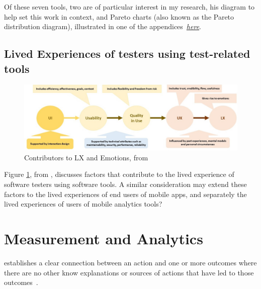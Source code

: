 Of these seven tools, two are of particular interest in my research, his diagram to help set this work in context, and Pareto charts (also known as the Pareto distribution diagram), illustrated in one of the appendices~\hyperlink{pareto.diagrams.in.r}{\emph{here}}.


\subsection{Lived Experiences of testers using test-related tools}
\begin{figure}
    \centering
    \includegraphics[width=15cm]{images/isabel-evans/Contributors_to_LX_v3.jpeg}
    \caption{Contributors to LX and Emotions, from~\citealp{evans2021_scared_frustrated_and_quietly_proud}}
    \label{fig:contributors-to-lx-and-emotions-v3}
\end{figure}

Figure \ref{fig:contributors-to-lx-and-emotions-v3}, from \citealp{evans2021_scared_frustrated_and_quietly_proud}, discusses factors that contribute to the lived experience of software testers using software tools. A similar consideration may extend these factors to the lived experiences of end users of mobile apps, and separately the lived experiences of users of mobile analytics tools?





\section{Measurement and Analytics}
 establishes a clear connection between an action and one or more outcomes where there are no other know explanations or sources of actions that have led to those outcomes~\cite[pp. 260-266]{mill1884system}.






